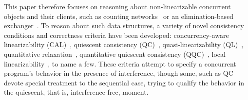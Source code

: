 This paper therefore focuses on reasoning about non-linearizable
concurrent objects and their clients, such as counting
networks~\cite{Aspnes-al:JACM94} or an elimination-based
exchanger~\cite{Scherer-al:SCOOL05}.
%
%
%
%
%
%
% 
To reason about such data structures, a variety of novel consistency
conditions and correctness criteria have been developed:
concurrency-aware linearizability (CAL)~\cite{Hemed-Rinetzky:PODC14},
quiescent consistency (QC)~\cite{Aspnes-al:JACM94},
quasi-linearizability (QL)~\cite{Afek-al:OPODIS10}, quantitative
relaxation~\cite{Henzinger-al:POPL13}, quantitative quiescent
consistency (QQC)~\cite{Jagadeesan-Riely:ICALP14}, local
linearizability~\cite{Haas-al-local15}, to name a few.
%
These criteria attempt to specify a concurrent program's behavior in
the presence of interference, though some, such as QC devote special
treatment to the sequential case, trying to qualify the behavior in
the quiescent, that is, interference-free, moment.

